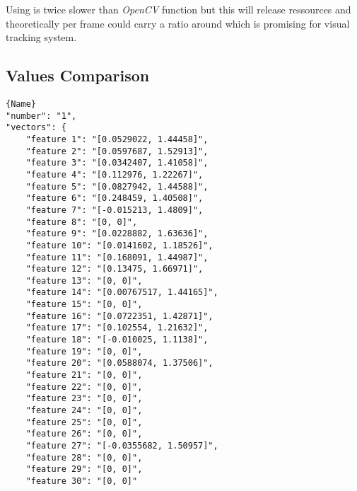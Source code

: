 Using \vc{} is twice slower than \emph{OpenCV} function but this will release  ressources and theoretically  per frame could carry a ratio around  which is promising for \iBubble{} visual tracking system.


\subsection{Values Comparison}

\noindent\begin{minipage}{.45\textwidth}
\begin{lstlisting}[caption={\code{calcOpticalFlowPyrLK} values},frame=tlrb,basicstyle=\tiny,label=openVal]{Name}
"number": "1",
"vectors": {
	"feature 1": "[0.0529022, 1.44458]",
	"feature 2": "[0.0597687, 1.52913]",
	"feature 3": "[0.0342407, 1.41058]",
	"feature 4": "[0.112976, 1.22267]",
	"feature 5": "[0.0827942, 1.44588]",
	"feature 6": "[0.248459, 1.40508]",
	"feature 7": "[-0.015213, 1.4809]",
	"feature 8": "[0, 0]",
	"feature 9": "[0.0228882, 1.63636]",
	"feature 10": "[0.0141602, 1.18526]",
	"feature 11": "[0.168091, 1.44987]",
	"feature 12": "[0.13475, 1.66971]",
	"feature 13": "[0, 0]",
	"feature 14": "[0.00767517, 1.44165]",
	"feature 15": "[0, 0]",
	"feature 16": "[0.0722351, 1.42871]",
	"feature 17": "[0.102554, 1.21632]",
	"feature 18": "[-0.010025, 1.1138]",
	"feature 19": "[0, 0]",
	"feature 20": "[0.0588074, 1.37506]",
	"feature 21": "[0, 0]",
	"feature 22": "[0, 0]",
	"feature 23": "[0, 0]",
	"feature 24": "[0, 0]",
	"feature 25": "[0, 0]",
	"feature 26": "[0, 0]",
	"feature 27": "[-0.0355682, 1.50957]",
	"feature 28": "[0, 0]",
	"feature 29": "[0, 0]",
	"feature 30": "[0, 0]"
\end{lstlisting}
\end{minipage}\hfill
